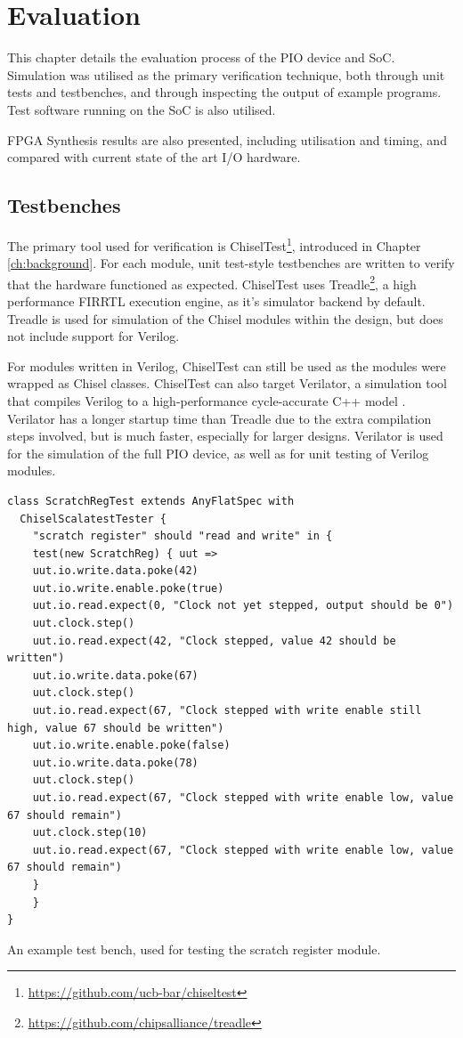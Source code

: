 \chapter{Evaluation}
\label{ch:evaluation}

This chapter details the evaluation process of the PIO device and SoC. Simulation was utilised as the primary verification technique, both through unit tests and testbenches, and through inspecting the output of example programs. Test software running on the SoC is also utilised.

FPGA Synthesis results are also presented, including utilisation and timing, and compared with current state of the art I/O hardware.

\section{Testbenches}

The primary tool used for verification is ChiselTest\footnote{\url{https://github.com/ucb-bar/chiseltest}}, introduced in Chapter \ref{ch:background}. For each module, unit test-style testbenches are written to verify that the hardware functioned as expected. ChiselTest uses Treadle\footnote{\url{https://github.com/chipsalliance/treadle}}, a high performance FIRRTL execution engine, as it's simulator backend by default. Treadle is used for simulation of the Chisel modules within the design, but does not include support for Verilog.

For modules written in Verilog, ChiselTest can still be used as the modules were wrapped as Chisel  classes. ChiselTest can also target Verilator, a simulation tool that compiles Verilog to a high-performance cycle-accurate C++ model \cite{verilator}. Verilator has a longer startup time than Treadle due to the extra compilation steps involved, but is much faster, especially for larger designs. Verilator is used for the simulation of the full PIO device, as well as for unit testing of Verilog modules.


\begin{listing}[h!]
    \vspace{0.5cm}
    \begin{verbatim}
class ScratchRegTest extends AnyFlatSpec with 
  ChiselScalatestTester {
    "scratch register" should "read and write" in {
    test(new ScratchReg) { uut =>
    uut.io.write.data.poke(42)
    uut.io.write.enable.poke(true)
    uut.io.read.expect(0, "Clock not yet stepped, output should be 0")
    uut.clock.step()
    uut.io.read.expect(42, "Clock stepped, value 42 should be written")
    uut.io.write.data.poke(67)
    uut.clock.step()
    uut.io.read.expect(67, "Clock stepped with write enable still high, value 67 should be written")
    uut.io.write.enable.poke(false)
    uut.io.write.data.poke(78)
    uut.clock.step()
    uut.io.read.expect(67, "Clock stepped with write enable low, value 67 should remain")
    uut.clock.step(10)
    uut.io.read.expect(67, "Clock stepped with write enable low, value 67 should remain")
    }
    }
}
    \end{verbatim}
    \caption{An example test bench, used for testing the scratch register module.}
    \label{lst:test}
\end{listing}

